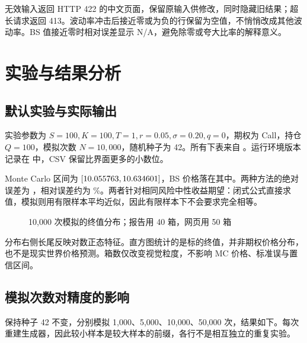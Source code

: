 \documentclass[UTF8,a4paper,12pt]{ctexart}
\begin{document}
无效输入返回 HTTP 422 的中文页面，保留原输入供修改，同时隐藏旧结果；超长请求返回 413。波动率冲击后接近零或为负的行保留为空值，不悄悄改成其他波动率。BS 值接近零时相对误差显示 N/A，避免除零或夸大比率的解释意义。
\newpage

\section{实验与结果分析}
\subsection{默认实验与实际输出}
实验参数为 $S=100,K=100,T=1,r=0.05,\sigma=0.20,q=0$，期权为 Call，持仓 $Q=100$，模拟次数 $N=10,000$，随机种子为 42。所有下表来自 。运行环境版本记录在  中，CSV 保留比界面更多的小数位。

\begin{table}[H]\centering

\caption{默认参数的实际计算结果}
\end{table}

Monte Carlo 区间为 $[10.055763,10.634601]$，BS 价格落在其中。两种方法的绝对误差为 \MCError，相对误差约为 \MCRelative\%。两者针对相同风险中性收益期望：闭式公式直接求值，模拟则用有限样本平均近似，因此有限样本下不会要求完全相等。

\begin{figure}[H]\centering
{}
\caption{10,000 次模拟的终值分布；报告用 40 箱，网页用 50 箱}
\end{figure}
分布右侧长尾反映对数正态特征。直方图统计的是标的终值，并非期权价格分布，也不是现实世界价格预测。箱数仅改变视觉粒度，不影响 MC 价格、标准误与置信区间。
\newpage

\subsection{模拟次数对精度的影响}
保持种子 42 不变，分别模拟 1,000、5,000、10,000、50,000 次，结果如下。每次重建生成器，因此较小样本是较大样本的前缀，各行不是相互独立的重复实验。
\end{document}
